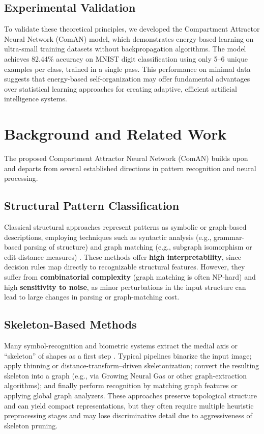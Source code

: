 \documentclass[12pt, a4paper]{article}
\begin{document}
\subsection*{Experimental Validation}

To validate these theoretical principles, we developed the Compartment Attractor Neural Network (ComAN) model, which demonstrates energy-based learning on ultra-small training datasets without backpropagation algorithms. The model achieves 82.44\% accuracy on MNIST digit classification using only 5--6 unique examples per class, trained in a single pass. This performance on minimal data suggests that energy-based self-organization may offer fundamental advantages over statistical learning approaches for creating adaptive, efficient artificial intelligence systems.

\section{Background and Related Work}

The proposed Compartment Attractor Neural Network (ComAN) builds upon and departs from several established directions in pattern recognition and neural processing.

\subsection*{Structural Pattern Classification}

Classical structural approaches represent patterns as symbolic or graph-based descriptions, employing techniques such as syntactic analysis (e.g., grammar-based parsing of structure) and graph matching (e.g., subgraph isomorphism or edit-distance measures) \cite{deraedt2008}. These methods offer \textbf{high interpretability}, since decision rules map directly to recognizable structural features. However, they suffer from \textbf{combinatorial complexity} (graph matching is often NP-hard) and high \textbf{sensitivity to noise}, as minor perturbations in the input structure can lead to large changes in parsing or graph-matching cost.

\subsection*{Skeleton-Based Methods}

Many symbol-recognition and biometric systems extract the medial axis or ``skeleton'' of shapes as a first step \cite{latecki1998, lam1997}. Typical pipelines binarize the input image; apply thinning or distance-transform--driven skeletonization; convert the resulting skeleton into a graph (e.g., via Growing Neural Gas \cite{fritzke1995} or other graph-extraction algorithms); and finally perform recognition by matching graph features or applying global graph analyzers. These approaches preserve topological structure and can yield compact representations, but they often require multiple heuristic preprocessing stages and may lose discriminative detail due to aggressiveness of skeleton pruning.
\end{document}
